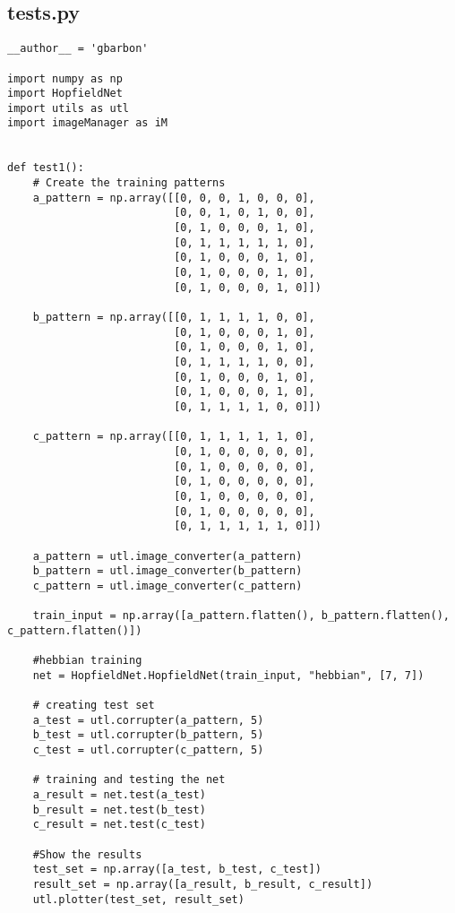 \documentclass[letterpaper,twocolumn,10pt]{article}
\begin{document}
\clearpage
\subsection{tests.py}
\begin{lstlisting}
__author__ = 'gbarbon'

import numpy as np
import HopfieldNet
import utils as utl
import imageManager as iM


def test1():
    # Create the training patterns
    a_pattern = np.array([[0, 0, 0, 1, 0, 0, 0],
                          [0, 0, 1, 0, 1, 0, 0],
                          [0, 1, 0, 0, 0, 1, 0],
                          [0, 1, 1, 1, 1, 1, 0],
                          [0, 1, 0, 0, 0, 1, 0],
                          [0, 1, 0, 0, 0, 1, 0],
                          [0, 1, 0, 0, 0, 1, 0]])

    b_pattern = np.array([[0, 1, 1, 1, 1, 0, 0],
                          [0, 1, 0, 0, 0, 1, 0],
                          [0, 1, 0, 0, 0, 1, 0],
                          [0, 1, 1, 1, 1, 0, 0],
                          [0, 1, 0, 0, 0, 1, 0],
                          [0, 1, 0, 0, 0, 1, 0],
                          [0, 1, 1, 1, 1, 0, 0]])

    c_pattern = np.array([[0, 1, 1, 1, 1, 1, 0],
                          [0, 1, 0, 0, 0, 0, 0],
                          [0, 1, 0, 0, 0, 0, 0],
                          [0, 1, 0, 0, 0, 0, 0],
                          [0, 1, 0, 0, 0, 0, 0],
                          [0, 1, 0, 0, 0, 0, 0],
                          [0, 1, 1, 1, 1, 1, 0]])

    a_pattern = utl.image_converter(a_pattern)
    b_pattern = utl.image_converter(b_pattern)
    c_pattern = utl.image_converter(c_pattern)

    train_input = np.array([a_pattern.flatten(), b_pattern.flatten(), c_pattern.flatten()])

    #hebbian training
    net = HopfieldNet.HopfieldNet(train_input, "hebbian", [7, 7])

    # creating test set
    a_test = utl.corrupter(a_pattern, 5)
    b_test = utl.corrupter(b_pattern, 5)
    c_test = utl.corrupter(c_pattern, 5)

    # training and testing the net
    a_result = net.test(a_test)
    b_result = net.test(b_test)
    c_result = net.test(c_test)

    #Show the results
    test_set = np.array([a_test, b_test, c_test])
    result_set = np.array([a_result, b_result, c_result])
    utl.plotter(test_set, result_set)



\end{lstlisting}
\end{document}
